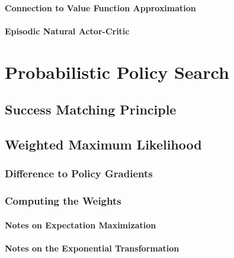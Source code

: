 				\paragraph{Connection to Value Function Approximation} %

				\paragraph{Episodic Natural Actor-Critic} %

	\section{Probabilistic Policy Search} %

		\subsection{Success Matching Principle} %

		\subsection{Weighted Maximum Likelihood} %

			\subsubsection{Difference to Policy Gradients} %

			\subsubsection{Computing the Weights} %

				\paragraph{Notes on Expectation Maximization} %

				\paragraph{Notes on the Exponential Transformation} %

